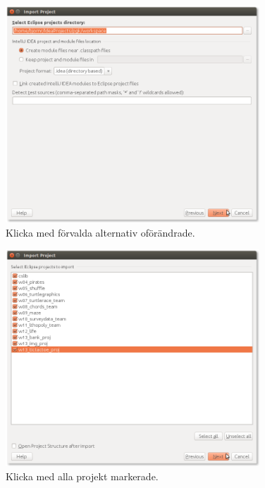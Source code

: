 \begin{figure}
\centering
\includegraphics[width=0.85\textwidth]{../img/intellij/idea-import4-directory.png} 
\caption{Klicka  med förvalda alternativ oförändrade.}
\label{fig:idea:import4-directory}
\end{figure}

\begin{figure}
\centering
\includegraphics[width=0.85\textwidth]{../img/intellij/idea-import5-select-projects.png} 
\caption{Klicka  med alla projekt markerade.}
\label{fig:idea:import5-select-projects}
\end{figure}

